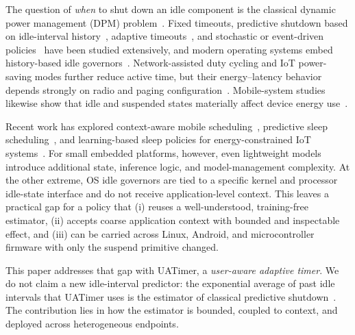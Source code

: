 \documentclass[journal]{IEEEtran}
\begin{document}
The question of \emph{when} to shut down an idle component is the classical dynamic power management (DPM) problem~\cite{benini2000survey}. Fixed timeouts, predictive shutdown based on idle-interval history~\cite{srivastava1996predictive,hwang2000predictive}, adaptive timeouts~\cite{douglis1995adaptive,helmbold1996dynamic}, and stochastic or event-driven policies~\cite{simunic2001event} have been studied extensively, and modern operating systems embed history-based idle governors~\cite{pallipadi2007cpuidle}. Network-assisted duty cycling and IoT power-saving modes further reduce active time, but their energy--latency behavior depends strongly on radio and paging configuration~\cite{michelinakis2021nbiot,eaps2022}. Mobile-system studies likewise show that idle and suspended states materially affect device energy use~\cite{carroll2010power}.

Recent work has explored context-aware mobile scheduling~\cite{lee2017cas}, predictive sleep scheduling~\cite{eaps2022}, and learning-based sleep policies for energy-constrained IoT systems~\cite{ko2025rass,ruiz2026wakeup}. For small embedded platforms, however, even lightweight models introduce additional state, inference logic, and model-management complexity. At the other extreme, OS idle governors are tied to a specific kernel and processor idle-state interface and do not receive application-level context. This leaves a practical gap for a policy that (i) reuses a well-understood, training-free estimator, (ii) accepts coarse application context with bounded and inspectable effect, and (iii) can be carried across Linux, Android, and microcontroller firmware with only the suspend primitive changed.

This paper addresses that gap with UATimer, a \emph{user-aware adaptive timer}. We do not claim a new idle-interval predictor: the exponential average of past idle intervals that UATimer uses is the estimator of classical predictive shutdown~\cite{hwang2000predictive}. The contribution lies in how the estimator is bounded, coupled to context, and deployed across heterogeneous endpoints.
\end{document}
